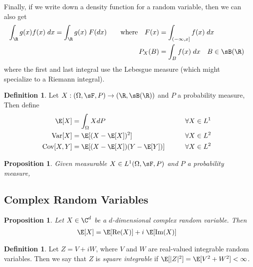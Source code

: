 \documentclass[12pt]{article}
\theoremstyle{plain}
\newtheorem{prop}[thm]{Proposition}
\theoremstyle{definition}
\newtheorem{defn}[thm]{Definition}
\theoremstyle{remark}
\newcommand{\ra}{\rightarrow}
\newcommand{\Cov}{\operatorname{Cov}}
\newcommand{\Var}{\operatorname{Var}}
\renewcommand{\Re}{\operatorname{Re}}
\renewcommand{\Im}{\operatorname{Im}}
\begin{document}
Finally, if we write down a density function for a random variable, then
we can also get
\begin{align*}
  \int_\R g(x)f(x) \; dx
  =
  \int_\R g(x) \; F(dx)
  \qquad \text{where}\quad
  F(x) &= \int_{(-\infty,x]} f(x)\; dx \\
  P_X(B) &= \int_{B} f(x)\; dx \quad B\in\sB(\R)
\end{align*}
where the first and last integral use the Lebesgue measure (which might
specialize to a Riemann integral).

\begin{defn}
Let $X:(\Omega,\sF,P)\ra (\R,\sB(\R))$ and $P$ a probability measure,
Then define
\begin{alignat*}{3}
  \E[X] &= \int_\Omega X dP &&\forall X\in L^1\\
  \Var[X] &= \E[(X-\E[X])^2]  &&\forall X\in L^2\\
  \Cov[X,Y] &= \E[(X-\E[X])(Y-\E[Y])] \qquad&&\forall X\in L^2
\end{alignat*}
\end{defn}

\begin{prop}
Given measurable $X\in L^1(\Omega,\sF,P)$ and $P$ a probability measure,
\end{prop}

\clearpage
\subsection{Complex Random Variables}

\begin{prop}
Let $X\in\C^d$ be a $d$-dimensional complex random variable. Then
\begin{align*}
  \E[X] = \E[\Re(X)] + i\;\E[\Im(X)]
\end{align*}
\end{prop}

\begin{defn}
Let $Z = V+iW$, where $V$ and $W$ are real-valued integrable random
variables. Then we say that $Z$ is \emph{square integrable} if
$\E[|Z|^2]=\E[V^2 + W^2]<\infty$.
\end{defn}
\end{document}
